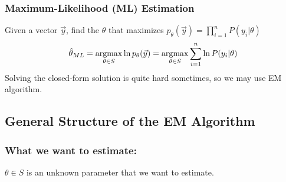 \documentclass[11pt,a4paper]{article}
\newcommand{\argmax}{\operatornamewithlimits{argmax}}
\begin{document}
\subsubsection*{Maximum-Likelihood (ML) Estimation}
Given a vector $\vec{y}$, find the $\theta$ that maximizes $p_\theta(\vec{y})=\prod_{i=1}^n P(y_i|\theta)$
$$\hat{\theta}_{ML}=\argmax_{\theta\in S}\ln p_\theta(\vec{y})=\argmax_{\theta\in S}\sum_{i=1}^n \ln P(y_i|\theta)$$
Solving the closed-form solution is quite hard sometimes, so we may use EM algorithm.

\subsection{General Structure of the EM Algorithm}

\subsubsection*{What we want to estimate:}
$\theta\in S$ is an unknown parameter that we want to estimate.
\end{document}

